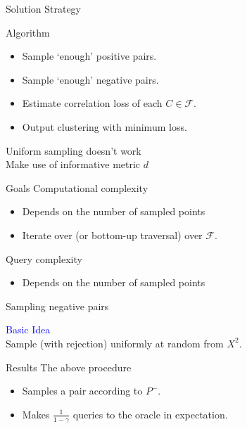 \documentclass{beamer}
\newcommand{\mc}{\mathcal}
\begin{document}
\begin{frame}{Solution Strategy}
	\begin{block}{Algorithm}
		\begin{itemize}
			\vspace{10pt}\item Sample `enough' positive pairs.
			\vspace{10pt}\item Sample `enough' negative pairs.
			\vspace{10pt}\item Estimate correlation loss of each $C \in \mc F$.
			\vspace{10pt}\item Output clustering with minimum loss.
		\end{itemize}
	\end{block}
	
	\vspace{20pt}Uniform sampling doesn't work\\
	\vspace{10pt}Make use of informative metric $d$
\end{frame}

\begin{frame}{Goals}
	Computational complexity
	\begin{itemize}
		\vspace{10pt}\item Depends on the number of sampled points
		\vspace{10pt}\item Iterate over (or bottom-up traversal) over $\mc F$.
	\end{itemize}
	
	\vspace{30pt}Query complexity
	\begin{itemize}
		\vspace{10pt}\item Depends on the number of sampled points
	\end{itemize}
	
\end{frame}


\begin{frame}{Sampling negative pairs}
	
	\vspace{10pt}\textcolor{blue}{Basic Idea}\\
	Sample (with rejection) uniformly at random from $X^2$. 
	
	\vspace{20pt}\begin{block}{Results}
		The above procedure
		\begin{itemize}
			\item Samples a pair according to $P^-$.
			\item Makes $\frac{1}{1-\gamma}$ queries to the oracle in expectation. 
		\end{itemize}			
	\end{block}
	
	
\end{frame}
\end{document}
